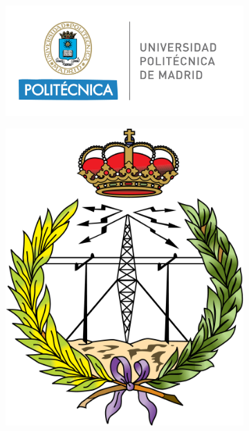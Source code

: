 \documentclass[a4paper]{book}
\begin{document}
\begin{figure}[t!]
	\centering
	\begin{subfigure}[b]{0.65\linewidth}
		\includegraphics[width=\linewidth]{../../Archivos comunes/upm_logo.png}
	\end{subfigure}
	\begin{subfigure}[b]{0.25\linewidth}
		\includegraphics[width=\linewidth]{../../Archivos comunes/etsist_logo.png}
	\end{subfigure}
\end{figure}
\end{document}
